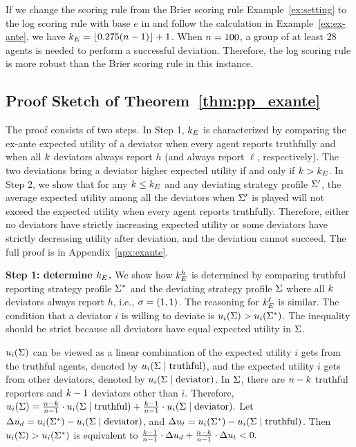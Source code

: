 \begin{example}
    \label{ex:log_vs_brier}
    If we change the scoring rule from the Brier scoring rule Example~\ref{ex:setting} to the log scoring rule with base $e$ in and follow the calculation in Example~\ref{ex:ex-ante}, we have $k_E = \lfloor 0.275 (n - 1)\rfloor + 1$. When $n = 100$, a group of at least 28 agents is needed to perform a successful deviation. Therefore, the log scoring rule is more robust than the Brier scoring rule in this instance. 
\end{example}

\subsection{Proof Sketch of Theorem~\ref{thm:pp_exante}}
The proof consists of two steps.
In Step 1, $k_E$ is characterized by comparing the ex-ante expected utility of a deviator when every agent reports truthfully and when all $k$ deviators always report $h$ (and always report $\ell$, respectively). The two deviations bring a deviator higher expected utility if and only if $k > k_E$. In Step 2, we show that for any $k \le k_E$ and any deviating strategy profile $\Sigma'$, the average expected utility among all the deviators when $\Sigma'$ is played will not exceed the expected utility when every agent reports truthfully. Therefore, either no deviators have strictly increasing expected utility or some deviators have strictly decreasing utility after deviation, and the deviation cannot succeed.
The full proof is in Appendix~\ref{apx:exante}. 

\noindent\textbf{Step 1: determine $k_E$.} We show how $k_E^h$ is determined by comparing truthful reporting strategy profile $\Sigma^*$ and the deviating strategy profile $\Sigma$ where all $k$ deviators always report $h$, i.e., $\sigma = (1, 1)$. The reasoning for $k_E^\ell$ is similar. The condition that a deviator $i$ is willing to deviate is $u_i(\Sigma) > u_i(\Sigma^*)$. The inequality should be strict because all deviators have equal expected utility in $\Sigma$.

$u_i(\Sigma)$ can be viewed as a linear combination of the expected utility $i$ gets from the truthful agents, denoted by $u_i(\Sigma \mid \text{truthful})$, and the expected utility $i$ gets from other deviators, denoted by $u_i(\Sigma \mid \text{deviator})$. In $\Sigma$, there are $n - k$ truthful reporters and $k - 1$ deviators other than $i$. Therefore, $u_i(\Sigma) = \frac{n - k}{n - 1}\cdot u_i(\Sigma \mid \text{truthful}) + \frac{k - 1}{n - 1}\cdot u_i(\Sigma \mid \text{deviator}).$
Let $\Delta u_d = u_i(\Sigma^*) -u_i(\Sigma\mid \text{deviator})$, and $\Delta u_t = u_i(\Sigma^*) -u_i(\Sigma\mid \text{truthful})$. Then $u_i(\Sigma) > u_i(\Sigma^*)$ is equivalent to
$\frac{k-1}{n -1} \cdot\Delta u_d + \frac{n -k}{n -1} \cdot \Delta u_t< 0.$

